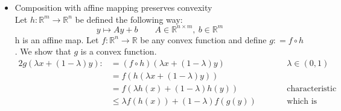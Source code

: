 \documentclass{article}
\begin{document}
\begin{itemize}
		\item Composition with affine mapping preserves convexity\\[2ex]
		Let $h: \mathbb R^m \rightarrow \mathbb R^n $ be defined the following way: \\
		\begin{equation*}
		y \mapsto Ay + b \qquad A\in \mathbb R^{n\times m}, \ b \in \mathbb R^m \end{equation*}
		h is an affine map. Let $f : \mathbb R^n \rightarrow \mathbb R$ be any convex function and define $g : = f \circ h$. We show that $g$ is a convex function.
		\begin{alignat*}{2}
			g(\lambda x + (1-\lambda)y) :&= 
			(f\circ h) (\lambda x + (1-\lambda)y) \qquad && \lambda \in (0,1)\\
			& = f(h(\lambda x + (1-\lambda)y)) \qquad &&\\
			& = f(\lambda h(x) + (1-\lambda) h (y)) \qquad && \text{characteristic property of affine maps}\\
			& \leq \lambda f(h(x)) + (1-\lambda )f(g(y)) \qquad &&\text{which is what we wanted to show}
		\end{alignat*}
		\end{itemize}

		
\end{document}
